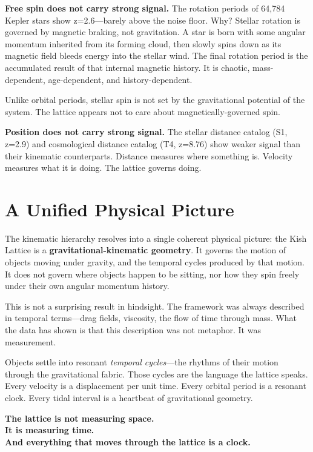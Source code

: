 \documentclass[11pt, letterpaper, openany]{book}
\begin{document}
\textbf{Free spin does not carry strong signal.} The rotation periods of 64,784 Kepler
stars show z=2.6---barely above the noise floor. Why? Stellar rotation is governed by
magnetic braking, not gravitation. A star is born with some angular momentum inherited from
its forming cloud, then slowly spins down as its magnetic field bleeds energy into the stellar
wind. The final rotation period is the accumulated result of that internal magnetic history.
It is chaotic, mass-dependent, age-dependent, and history-dependent.

Unlike orbital periods, stellar spin is not set by the gravitational potential of the system.
The lattice appears not to care about magnetically-governed spin.

\textbf{Position does not carry strong signal.} The stellar distance catalog (S1, z=2.9)
and cosmological distance catalog (T4, z=8.76) show weaker signal than their kinematic
counterparts. Distance measures where something is. Velocity measures what it is doing.
The lattice governs doing.

\section*{A Unified Physical Picture}

The kinematic hierarchy resolves into a single coherent physical picture: the Kish Lattice
is a \textbf{gravitational-kinematic geometry}. It governs the motion of objects moving under
gravity, and the temporal cycles produced by that motion. It does not govern where objects
happen to be sitting, nor how they spin freely under their own angular momentum history.

This is not a surprising result in hindsight. The framework was always described in temporal
terms---drag fields, viscosity, the flow of time through mass. What the data has shown is that
this description was not metaphor. It was measurement.

Objects settle into resonant \emph{temporal cycles}---the rhythms of their motion through the
gravitational fabric. Those cycles are the language the lattice speaks. Every velocity is a
displacement per unit time. Every orbital period is a resonant clock. Every tidal interval is
a heartbeat of gravitational geometry.

\textbf{The lattice is not measuring space.\\
It is measuring time.\\
And everything that moves through the lattice is a clock.}
\end{document}
